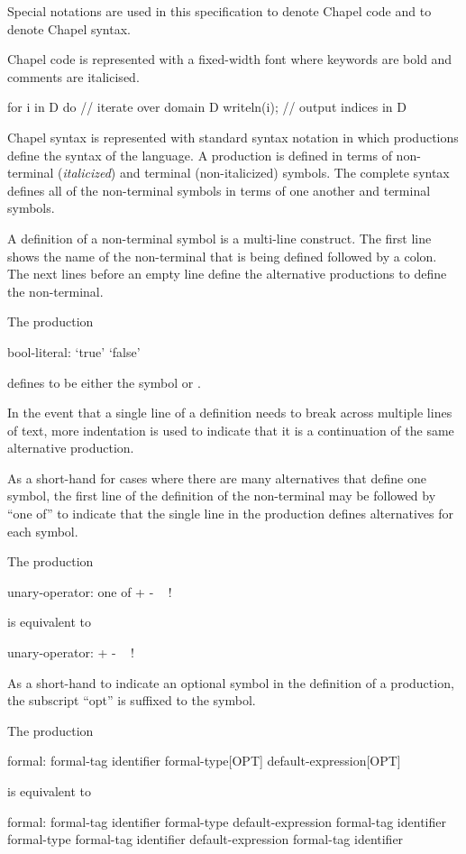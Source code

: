 \label{Notation}

Special notations are used in this specification to denote Chapel code
and to denote Chapel syntax.

Chapel code is represented with a fixed-width font where keywords are
bold and comments are italicised.
\begin{example}
\begin{chapel}
for i in D do   // iterate over domain D
  writeln(i);   // output indices in D
\end{chapel}
\end{example}

Chapel syntax is represented with standard syntax notation in which
productions define the syntax of the language.  A production is
defined in terms of non-terminal ({\it italicized}) and terminal
(non-italicized) symbols.  The complete syntax defines all of the
non-terminal symbols in terms of one another and terminal symbols.

A definition of a non-terminal symbol is a multi-line construct.  The
first line shows the name of the non-terminal that is being defined
followed by a colon.  The next lines before an empty line define the
alternative productions to define the non-terminal.
\begin{example}
The production
\begin{syntax}
bool-literal:
  `true'
  `false'
\end{syntax}
defines  to be either the symbol  or
.
\end{example}
In the event that a single line of a definition needs to break across
multiple lines of text, more indentation is used to indicate that it
is a continuation of the same alternative production.

As a short-hand for cases where there are many alternatives that
define one symbol, the first line of the definition of the
non-terminal may be followed by ``one of'' to indicate that the single
line in the production defines alternatives for each symbol.
\begin{example}
The production
\begin{syntax}
unary-operator: one of
  + - ~ !
\end{syntax}
is equivalent to
\begin{syntax}
unary-operator:
  +
  -
  ~
  !
\end{syntax}
\end{example}

As a short-hand to indicate an optional symbol in the definition of a
production, the subscript ``opt'' is suffixed to the symbol.
\begin{example}
The production
\begin{syntax}
formal:
  formal-tag identifier formal-type[OPT] default-expression[OPT]
\end{syntax}
is equivalent to
\begin{syntax}
formal:
  formal-tag identifier formal-type default-expression
  formal-tag identifier formal-type
  formal-tag identifier default-expression
  formal-tag identifier
\end{syntax}
\end{example}
